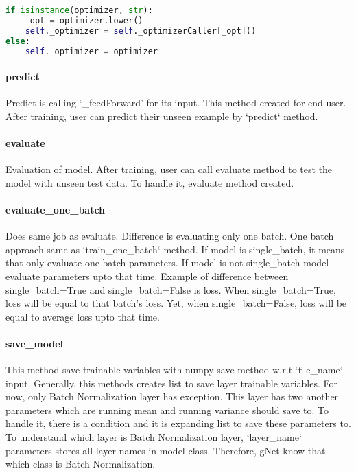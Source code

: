\documentclass[12pt]{report}
\begin{document}
\begin{lstlisting}[language=Python, numbers=none, caption={Assigning optimizer.}, label={lis:isistance}]
if isinstance(optimizer, str):
	_opt = optimizer.lower()
	self._optimizer = self._optimizerCaller[_opt]()
else:
	self._optimizer = optimizer
\end{lstlisting}

\paragraph{predict}
Predict is calling `\_feedForward' for its input. This method created for end-user. After training, user can predict their unseen example by `predict` method. 

\paragraph{evaluate}
Evaluation of model. After training, user can call evaluate method to test the model with unseen test data. To handle it, evaluate method created.

\paragraph{evaluate\_one\_batch}
Does same job as evaluate. Difference is evaluating only one batch. One batch approach same as `train\_one\_batch` method. If model is single\_batch, it means that only evaluate one batch parameters. If model is not single\_batch model evaluate parameters upto that time. Example of difference between single\_batch=True and single\_batch=False is loss. When single\_batch=True, loss will be equal to that batch's loss. Yet, when single\_batch=False, loss will be equal to average loss upto that time. 

\paragraph{save\_model}
This method save trainable variables with numpy save method w.r.t `file\_name` input. Generally, this methods creates list to save layer trainable variables. For now, only Batch Normalization layer has exception. This layer has two another parameters which are running mean and running variance should save to. To handle it, there is a condition and it is expanding list to save these parameters to. To understand which layer is Batch Normalization layer, `layer\_name` parameters stores all layer names in model class. Therefore, gNet know that which class is Batch Normalization.
\end{document}

